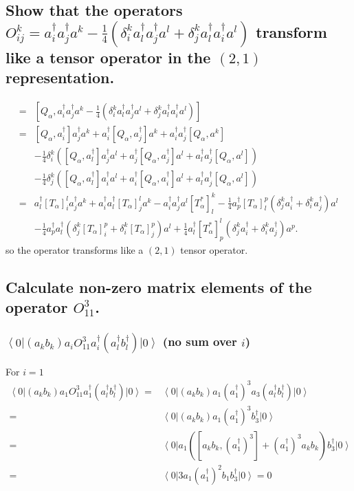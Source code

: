 \documentclass[main.tex]{subfiles}
\begin{document}
\subsection{Show that the operators $O^k_{ij}=a^{\dagger}_ia^{\dagger}_ja^k-\frac{1}{4}(\delta_{i}^ka^{\dagger}_la^{\dagger}_ja^l+\delta_{j}^ka^{\dagger}_la^{\dagger}_ia^l)$ transform like a tensor operator in the $(2,1)$ representation.}
\begin{align}
[Q_{\alpha},O_{ij}^k]=&[Q_{\alpha},a^{\dagger}_ia^{\dagger}_ja^k-\frac{1}{4}(\delta_{i}^ka^{\dagger}_la^{\dagger}_ja^l+\delta_{j}^ka^{\dagger}_la^{\dagger}_ia^l)]\\
=&[Q_{\alpha},a^{\dagger}_i]a^{\dagger}_ja^k+a^{\dagger}_i[Q_{\alpha},a^{\dagger}_j]a^k+a^{\dagger}_ia^{\dagger}_j[Q_{\alpha},a^k]\nonumber\\
&-\frac{1}{4}\delta_i^k\left([Q_{\alpha},a^{\dagger}_l]a_j^{\dagger}a^l+a_j^{\dagger}[Q_{\alpha},a^{\dagger}_j]a^l+a_l^{\dagger}a_j^{\dagger}[Q_{\alpha},a^l]\right)\\
&-\frac{1}{4}\delta_j^k\left([Q_{\alpha},a^{\dagger}_l]a_i^{\dagger}a^l+a_i^{\dagger}[Q_{\alpha},a^{\dagger}_i]a^l+a_l^{\dagger}a_j^{\dagger}[Q_{\alpha},a^l]\right)\nonumber\\
=&a^{\dagger}_l[T_{\alpha}]_i^la^{\dagger}_ja^k+a^{\dagger}_ia^{\dagger}_l[T_{\alpha}]^l_{j}a^k-a^{\dagger}_ia^{\dagger}_ja^l[T_{\alpha}^*]_{l}^k-\frac{1}{4}a_p^{\dagger}[T_{\alpha}]^p_l(\delta^k_ja_i^{\dagger}+\delta^k_ia_j^{\dagger})a^l\nonumber\\
&-\frac{1}{4}a_p^{\dagger}a_l^{\dagger}(\delta^k_j[T_{\alpha}]^p_i+\delta^k_i[T_{\alpha}]^p_j)a^l+\frac{1}{4}a_l^{\dagger}[T^*_{\alpha}]^l_p(\delta^k_ja_i^{\dagger}+\delta^k_ia_j^{\dagger})a^p.
\end{align}
so the operator transforms like a $(2,1)$ tensor operator.
\subsection{Calculate non-zero matrix elements of the operator $O^3_{11}$.}
\subsubsection{$\left<0\right|(a_kb_k)a_iO^3_{11}a^{\dagger}_i(a^{\dagger}_l b^{\dagger}_l)\left|0\right>$ (no sum over $i$)}
For $i=1$
\begin{align}
\left<0\right|(a_kb_k)a_1O^3_{11}a^{\dagger}_1(a^{\dagger}_l b^{\dagger}_l)\left|0\right>=&\left<0\right|(a_kb_k)a_1(a^{\dagger}_1)^3a_3(a^{\dagger}_l b^{\dagger}_l)\left|0\right>\\
=&\left<0\right|(a_kb_k)a_1(a^{\dagger}_1)^3b^{\dagger}_3\left|0\right>\\
=&\left<0\right|a_1([a_kb_k,(a^{\dagger}_1)^3]+(a^{\dagger}_1)^3a_kb_k)b^{\dagger}_3\left|0\right>\\
=&\left<0\right|3a_1(a^{\dagger}_1)^2b_1b^{\dagger}_3\left|0\right>=0
\end{align}
\end{document}
